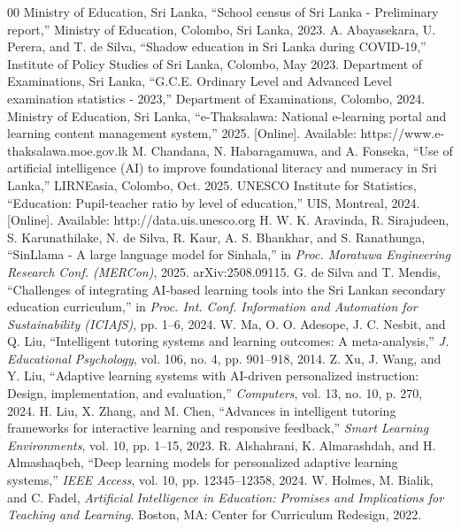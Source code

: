 \documentclass[conference]{IEEEtran}
\begin{document}
\begin{thebibliography}{00}
 Ministry of Education, Sri Lanka, ``School census of Sri Lanka - Preliminary report,'' Ministry of Education, Colombo, Sri Lanka, 2023.
 A. Abayasekara, U. Perera, and T. de Silva, ``Shadow education in Sri Lanka during COVID-19,'' Institute of Policy Studies of Sri Lanka, Colombo, May 2023.
 Department of Examinations, Sri Lanka, ``G.C.E. Ordinary Level and Advanced Level examination statistics - 2023,'' Department of Examinations, Colombo, 2024.
 Ministry of Education, Sri Lanka, ``e-Thaksalawa: National e-learning portal and learning content management system,'' 2025. [Online]. Available: https://www.e-thaksalawa.moe.gov.lk
 M. Chandana, N. Habaragamuwa, and A. Fonseka, ``Use of artificial intelligence (AI) to improve foundational literacy and numeracy in Sri Lanka,'' LIRNEasia, Colombo, Oct. 2025.
 UNESCO Institute for Statistics, ``Education: Pupil-teacher ratio by level of education,'' UIS, Montreal, 2024. [Online]. Available: http://data.uis.unesco.org
 H. W. K. Aravinda, R. Sirajudeen, S. Karunathilake, N. de Silva, R. Kaur, A. S. Bhankhar, and S. Ranathunga, ``SinLlama - A large language model for Sinhala,'' in \textit{Proc. Moratuwa Engineering Research Conf. (MERCon)}, 2025. arXiv:2508.09115.
 G. de Silva and T. Mendis, ``Challenges of integrating AI-based learning tools into the Sri Lankan secondary education curriculum,'' in \textit{Proc. Int. Conf. Information and Automation for Sustainability (ICIAfS)}, pp. 1--6, 2024.
 W. Ma, O. O. Adesope, J. C. Nesbit, and Q. Liu, ``Intelligent tutoring systems and learning outcomes: A meta-analysis,'' \textit{J. Educational Psychology}, vol. 106, no. 4, pp. 901--918, 2014.
 Z. Xu, J. Wang, and Y. Liu, ``Adaptive learning systems with AI-driven personalized instruction: Design, implementation, and evaluation,'' \textit{Computers}, vol. 13, no. 10, p. 270, 2024.
 H. Liu, X. Zhang, and M. Chen, ``Advances in intelligent tutoring frameworks for interactive learning and responsive feedback,'' \textit{Smart Learning Environments}, vol. 10, pp. 1--15, 2023.
 R. Alshahrani, K. Almarashdah, and H. Almashaqbeh, ``Deep learning models for personalized adaptive learning systems,'' \textit{IEEE Access}, vol. 10, pp. 12345--12358, 2024.
 W. Holmes, M. Bialik, and C. Fadel, \textit{Artificial Intelligence in Education: Promises and Implications for Teaching and Learning}. Boston, MA: Center for Curriculum Redesign, 2022.

\end{thebibliography}
\end{document}
